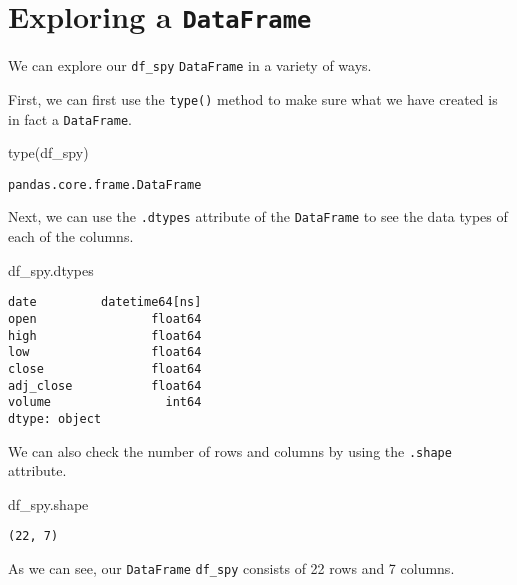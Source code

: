 \documentclass[
  letterpaper,
  DIV=11,
  numbers=noendperiod]{scrreprt}
\newenvironment{Shaded}{\begin{snugshade}}{\end{snugshade}}
\newcommand{\BuiltInTok}[1]{\textcolor[rgb]{0.00,0.23,0.31}{#1}}
\newcommand{\NormalTok}[1]{\textcolor[rgb]{0.00,0.23,0.31}{#1}}
\begin{document}
\hypertarget{exploring-a-dataframe}{%
\section{\texorpdfstring{Exploring a
\texttt{DataFrame}}{Exploring a DataFrame}}\label{exploring-a-dataframe}}

We can explore our \texttt{df\_spy} \texttt{DataFrame} in a variety of
ways.

First, we can first use the \texttt{type()} method to make sure what we
have created is in fact a \texttt{DataFrame}.

\begin{Shaded}
\begin{Highlighting}[]
\BuiltInTok{type}\NormalTok{(df\_spy)}
\end{Highlighting}
\end{Shaded}

\begin{verbatim}
pandas.core.frame.DataFrame
\end{verbatim}

Next, we can use the \texttt{.dtypes} attribute of the
\texttt{DataFrame} to see the data types of each of the columns.

\begin{Shaded}
\begin{Highlighting}[]
\NormalTok{df\_spy.dtypes}
\end{Highlighting}
\end{Shaded}

\begin{verbatim}
date         datetime64[ns]
open                float64
high                float64
low                 float64
close               float64
adj_close           float64
volume                int64
dtype: object
\end{verbatim}

We can also check the number of rows and columns by using the
\texttt{.shape} attribute.

\begin{Shaded}
\begin{Highlighting}[]
\NormalTok{df\_spy.shape}
\end{Highlighting}
\end{Shaded}

\begin{verbatim}
(22, 7)
\end{verbatim}

As we can see, our \texttt{DataFrame} \texttt{df\_spy} consists of 22
rows and 7 columns.
\end{document}
